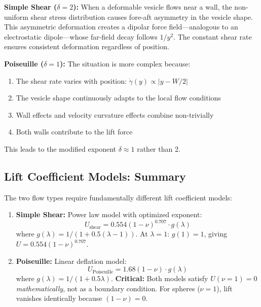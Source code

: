 \documentclass{article}
\begin{document}
\textbf{Simple Shear ($\delta = 2$):} When a deformable vesicle flows near a wall, the non-uniform shear stress distribution causes fore-aft asymmetry in the vesicle shape. This asymmetric deformation creates a dipolar force field---analogous to an electrostatic dipole---whose far-field decay follows $1/y^2$. The constant shear rate ensures consistent deformation regardless of position.

\textbf{Poiseuille ($\delta = 1$):} The situation is more complex because:
\begin{enumerate}
    \item The shear rate varies with position: $\dot{\gamma}(y) \propto |y - W/2|$
    \item The vesicle shape continuously adapts to the local flow conditions
    \item Wall effects and velocity curvature effects combine non-trivially
    \item Both walls contribute to the lift force
\end{enumerate}
This leads to the modified exponent $\delta \approx 1$ rather than 2.

\subsection{Lift Coefficient Models: Summary}

The two flow types require fundamentally different lift coefficient models:

\begin{enumerate}
    \item \textbf{Simple Shear:} Power law model with optimized exponent:
    \begin{equation}
        U_{\text{shear}} = 0.554(1-\nu)^{0.707} \cdot g(\lambda)
    \end{equation}
    where $g(\lambda) = 1/(1 + 0.5(\lambda-1))$. At $\lambda = 1$: $g(1) = 1$, giving $U = 0.554(1-\nu)^{0.707}$.
    
    \item \textbf{Poiseuille:} Linear deflation model:
    \begin{equation}
        U_{\text{Poiseuille}} = 1.68(1-\nu) \cdot g(\lambda)
    \end{equation}
    where $g(\lambda) = 1/(1 + 0.5\lambda)$. \textbf{Critical:} Both models satisfy $U(\nu=1) = 0$ \emph{mathematically}, not as a boundary condition. For spheres ($\nu = 1$), lift vanishes identically because $(1-\nu) = 0$.
\end{enumerate}
\end{document}

